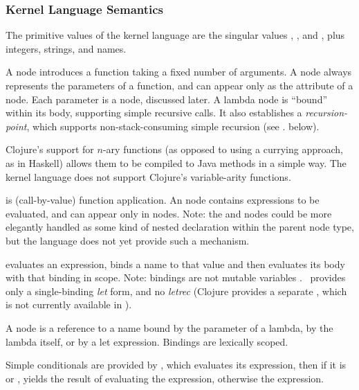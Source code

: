 \subsubsection{Kernel Language Semantics}
The primitive values of the kernel language are the singular values , , and , plus integers, strings, and names.

A  node introduces a function taking a fixed number of arguments. A  node always represents the parameters of a function, and can appear only as the  attribute of a  node. Each parameter is a  node, discussed later. A lambda node is ``bound'' within its body, supporting simple recursive calls. It also establishes a \emph{recursion-point}, which supports non-stack-consuming simple recursion (see . below).

Clojure's support for $n$-ary functions (as opposed to using a currying approach, as in Haskell) allows them to be compiled to Java methods in a simple way. The kernel language does not support Clojure's variable-arity functions.

 is (call-by-value) function application. An  node contains expressions to be evaluated, and can appear only in  nodes. Note: the   and  nodes could be more elegantly handled as some kind of nested declaration within the parent node type, but the  language does not yet provide such a mechanism.

 evaluates an expression, binds a name to that value and then evaluates its body with that binding in scope. Note: bindings are not mutable variables . \Meta\ provides only a single-binding \emph{let} form, and no \emph{letrec} (Clojure provides a separate , which is not currently available in \Meta).

A  node is a reference to a name bound by the parameter of a lambda, by the lambda itself, or by a let expression. Bindings are lexically scoped. 

Simple conditionals are provided by , which evaluates its  expression, then if it is  or , yields the result of evaluating the  expression, otherwise the  expression.

